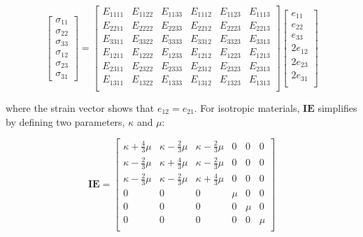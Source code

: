 \documentclass[10pt]{article}
\begin{document}
\begin{equation}
\begin{bmatrix}\sigma_{11} \\ \sigma_{22} \\ \sigma_{33} \\ \sigma_{12} \\ \sigma_{23} \\ \sigma_{31}\end{bmatrix}=
\begin{bmatrix}E_{1111} & E_{1122} & E_{1133} & E_{1112} & E_{1123} & E_{1113} \\
E_{2211} & E_{2222} & E_{2233} & E_{2212} & E_{2223} & E_{2213} \\
E_{3311} & E_{3322} & E_{3333} & E_{3312} & E_{3323} & E_{3313}\\
E_{1211} & E_{1222} & E_{1233} & E_{1212} & E_{1223} & E_{1213}\\
E_{2311} & E_{2322} & E_{2333} & E_{2312} & E_{2323} & E_{2313}\\
E_{1311} & E_{1322} & E_{1333} & E_{1312} & E_{1323} & E_{1313}\\
\end{bmatrix}
\begin{bmatrix}e_{11} \\ e_{22} \\ e_{33} \\ 2e_{12} \\ 2e_{23} \\ 2e_{31}\\
\end{bmatrix}
\end{equation}

where the strain vector shows that \(e_{12}=e_{21}\). For isotropic materials, \(\textbf{IE}\) simplifies by defining two parameters, \(\kappa\) and \(\mu\):

\begin{equation}
\textbf{IE}=\begin{bmatrix}\kappa+\frac{4}{3}\mu & \kappa-\frac{2}{3}\mu & \kappa-\frac{2}{3}\mu & 0 & 0 & 0\\
\kappa-\frac{2}{3}\mu & \kappa+\frac{4}{3}\mu & \kappa-\frac{2}{3}\mu & 0 & 0 & 0\\
\kappa-\frac{2}{3}\mu & \kappa-\frac{2}{3}\mu & \kappa+\frac{4}{3}\mu & 0 & 0 & 0\\
0 & 0 & 0 & \mu & 0 & 0\\
0 & 0 & 0 & 0 & \mu & 0\\
0 & 0 & 0 & 0 & 0 & \mu\\
\end{bmatrix}
\end{equation}
\end{document}
